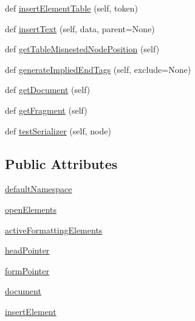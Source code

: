 \begin{DoxyCompactItemize}
def \hyperlink{classpip_1_1__vendor_1_1html5lib_1_1treebuilders_1_1base_1_1TreeBuilder_a8d8877473929a4e8674a5e85219c7da5}{insert\+Element\+Table} (self, token)
\item 
def \hyperlink{classpip_1_1__vendor_1_1html5lib_1_1treebuilders_1_1base_1_1TreeBuilder_adab6fe53cf38c1e4fd8d8f651e92ee24}{insert\+Text} (self, data, parent=None)
\item 
def \hyperlink{classpip_1_1__vendor_1_1html5lib_1_1treebuilders_1_1base_1_1TreeBuilder_aa89a38b3beeaae6fd5fb35e55cc061c3}{get\+Table\+Misnested\+Node\+Position} (self)
\item 
def \hyperlink{classpip_1_1__vendor_1_1html5lib_1_1treebuilders_1_1base_1_1TreeBuilder_adc611ab24a9f006a5c5639eb4932b3a5}{generate\+Implied\+End\+Tags} (self, exclude=None)
\item 
def \hyperlink{classpip_1_1__vendor_1_1html5lib_1_1treebuilders_1_1base_1_1TreeBuilder_a8c9d62170e88862216bb6581dd188f68}{get\+Document} (self)
\item 
def \hyperlink{classpip_1_1__vendor_1_1html5lib_1_1treebuilders_1_1base_1_1TreeBuilder_a3e5e92197e81473f5a9ad92e07ef0bda}{get\+Fragment} (self)
\item 
def \hyperlink{classpip_1_1__vendor_1_1html5lib_1_1treebuilders_1_1base_1_1TreeBuilder_a257a7fc087d38885ff0287cc603267ba}{test\+Serializer} (self, node)
\end{DoxyCompactItemize}
\subsection*{Public Attributes}
\begin{DoxyCompactItemize}
\item 
\hyperlink{classpip_1_1__vendor_1_1html5lib_1_1treebuilders_1_1base_1_1TreeBuilder_a2eded54e8f0c0fffc220ea7a7c4741bc}{default\+Namespace}
\item 
\hyperlink{classpip_1_1__vendor_1_1html5lib_1_1treebuilders_1_1base_1_1TreeBuilder_a937f682fc3759ce15ccf591a751f92a0}{open\+Elements}
\item 
\hyperlink{classpip_1_1__vendor_1_1html5lib_1_1treebuilders_1_1base_1_1TreeBuilder_a6a1927c476c34080194b0420bffcd4f0}{active\+Formatting\+Elements}
\item 
\hyperlink{classpip_1_1__vendor_1_1html5lib_1_1treebuilders_1_1base_1_1TreeBuilder_ac026c94aa8346bb63c67a4839407ce00}{head\+Pointer}
\item 
\hyperlink{classpip_1_1__vendor_1_1html5lib_1_1treebuilders_1_1base_1_1TreeBuilder_ae40b617b01afec06ecdac7ee60cbd8b7}{form\+Pointer}
\item 
\hyperlink{classpip_1_1__vendor_1_1html5lib_1_1treebuilders_1_1base_1_1TreeBuilder_a56d4897d02371c0ab07ab452ff3de904}{document}
\item 
\hyperlink{classpip_1_1__vendor_1_1html5lib_1_1treebuilders_1_1base_1_1TreeBuilder_a5ef9094ab92dc4e788a16b5f0193986e}{insert\+Element}
\end{DoxyCompactItemize}
